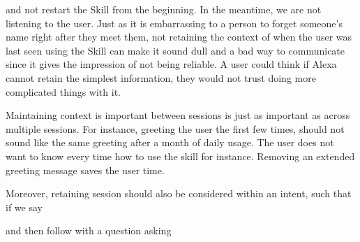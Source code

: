 

\noindent and not restart the Skill from the beginning. In the meantime, we are not listening to the user. Just as it is embarrassing to a person to forget someone's name right after they meet them, not retaining the context of when the user was last seen using the Skill can make it sound dull and a bad way to communicate since it gives the impression of not being reliable. A user could think if Alexa cannot retain the simplest information, they would not trust doing more complicated things with it.

Maintaining context is important between sessions is just as important as across multiple sessions. For instance, greeting the user the first few times, should not sound like the same greeting after a month of daily usage. The user does not want to know every time how to use the skill for instance. Removing an extended greeting message saves the user time.

Moreover, retaining session should also be considered within an intent, such that if we say


\begin{flushright}
\end{flushright}
\noindent and then follow with a question asking


